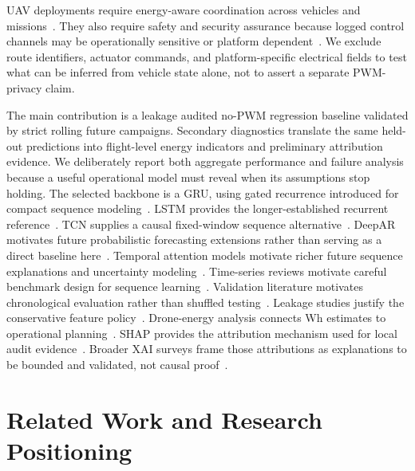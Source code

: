 \documentclass[runningheads,a4paper]{llncs}
\begin{document}
UAV deployments require energy-aware coordination across vehicles and missions~\cite{hayat2016survey}. They also require safety and security assurance because logged control channels may be operationally sensitive or platform dependent~\cite{yaacoub2020security}. We exclude route identifiers, actuator commands, and platform-specific electrical fields to test what can be inferred from vehicle state alone, not to assert a separate PWM-privacy claim.

The main contribution is a leakage audited no-PWM regression baseline validated by strict rolling future campaigns. Secondary diagnostics translate the same held-out predictions into flight-level energy indicators and preliminary attribution evidence. We deliberately report both aggregate performance and failure analysis because a useful operational model must reveal when its assumptions stop holding. The selected backbone is a GRU, using gated recurrence introduced for compact sequence modeling~\cite{cho2014gru}. LSTM provides the longer-established recurrent reference~\cite{hochreiter1997lstm}. TCN supplies a causal fixed-window sequence alternative~\cite{bai2018tcn}. DeepAR motivates future probabilistic forecasting extensions rather than serving as a direct baseline here~\cite{salinas2020deepar}. Temporal attention models motivate richer future sequence explanations and uncertainty modeling~\cite{lim2021tft}. Time-series reviews motivate careful benchmark design for sequence learning~\cite{fawaz2019dlts}. Validation literature motivates chronological evaluation rather than shuffled testing~\cite{bergmeir2018cv}. Leakage studies justify the conservative feature policy~\cite{kaufman2012leakage}. Drone-energy analysis connects Wh estimates to operational planning~\cite{stolaroff2018drone}. SHAP provides the attribution mechanism used for local audit evidence~\cite{lundberg2017shap}. Broader XAI surveys frame those attributions as explanations to be bounded and validated, not causal proof~\cite{arrieta2020xai}.

\section{Related Work and Research Positioning}
\end{document}

